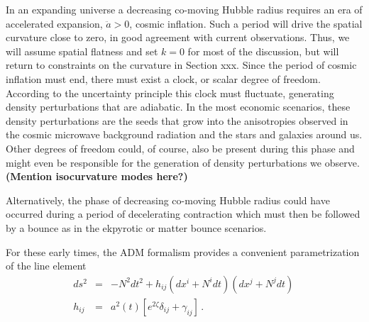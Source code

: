 
In an expanding universe a decreasing co-moving Hubble radius requires an era of accelerated expansion, $\ddot{a}>0$, cosmic inflation. Such a period will drive the spatial curvature close to zero, in good agreement with current observations. Thus, we will assume spatial flatness and set $k=0$ for most of the discussion, but will return to constraints on the curvature in Section xxx. Since the period of cosmic inflation must end, there must exist a clock, or scalar degree of freedom. According to the uncertainty principle this clock must fluctuate, generating density perturbations that are adiabatic. In the most economic scenarios, these density perturbations are the seeds that grow into the anisotropies observed in the cosmic microwave background radiation and the stars and galaxies around us. Other degrees of freedom could, of course, also be present during this phase and might even be responsible for the generation of density perturbations we observe. {\bf (Mention isocurvature modes here?)}

Alternatively, the phase of decreasing co-moving Hubble radius could have occurred during a period of decelerating contraction which must then be followed by a bounce as in the ekpyrotic or matter bounce scenarios. 

For these early times, the ADM formalism provides a convenient parametrization of the line element
\begin{eqnarray}
\label{eq:metric}
ds^2&=&-N^2dt^2 +h_{ij}(dx^i+N^idt)(dx^j+N^jdt)\,\nonumber\\
h_{ij}&=&a^2(t)[e^{2\zeta}\delta_{ij}+\gamma_{ij}]\,.
\end{eqnarray}

